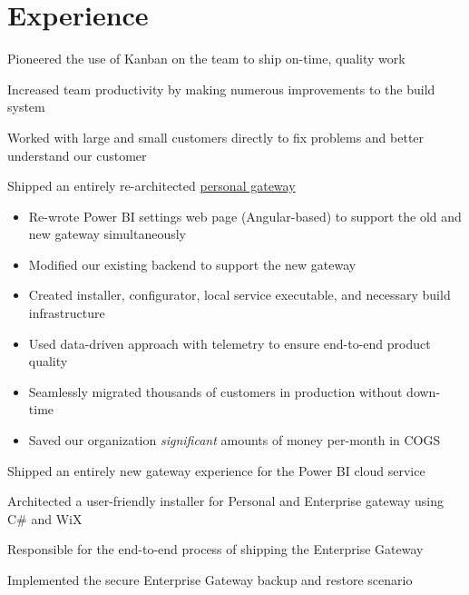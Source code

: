 \documentclass{resume}
\begin{document}
\maketitle
\thispagestyle{empty}

\section{Experience}
\begin{position}
  \item Pioneered the use of Kanban on the team to ship on-time, quality work
  \item Increased team productivity by making numerous improvements to the build system
  \item Worked with large and small customers directly to fix problems and better understand our customer
  \item Shipped an entirely re-architected \href{https://goo.gl/hFDcbR}{personal gateway}
  \begin{itemize}
    \item Re-wrote Power BI settings web page (Angular-based) to support the old and new gateway simultaneously
    \item Modified our existing backend to support the new gateway
    \item Created installer, configurator, local service executable, and necessary build infrastructure
    \item Used data-driven approach with telemetry to ensure end-to-end product quality
    \item Seamlessly migrated thousands of customers in production without down-time
    \item Saved our organization \emph{significant} amounts of money per-month in COGS
  \end{itemize}
\end{position}

\begin{position}
  \item Shipped an entirely new gateway experience for the Power BI cloud service
  \item Architected a user-friendly installer for Personal and Enterprise gateway using C\# and WiX
  \item Responsible for the end-to-end process of shipping the Enterprise Gateway
  \item Implemented the secure Enterprise Gateway backup and restore scenario
\end{position}
\end{document}
